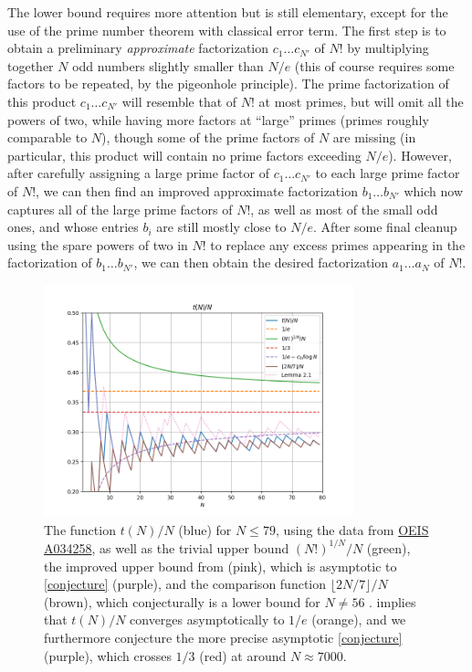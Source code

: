 \documentclass[12pt,a4paper,reqno]{amsart}
\numberwithin{equation}{section}
\theoremstyle{plain}
\theoremstyle{definition}
\begin{document}
The lower bound requires more attention but is still elementary, except for the use of the prime number theorem with classical error term.  The first step is to obtain a preliminary \emph{approximate} factorization $c_1 \dots c_{N'}$ of $N!$ by multiplying together $N$ odd numbers slightly smaller than $N/e$ (this of course requires some factors to be repeated, by the pigeonhole principle).  The prime factorization of this product $c_1 \dots c_{N'}$ will resemble that of $N!$ at most primes, but will omit all the powers of two, while having more factors at ``large'' primes (primes roughly comparable to $N$), though some of the prime factors of $N$ are missing (in particular, this product will contain no prime factors exceeding $N/e$).  However, after carefully assigning a large prime factor of $c_1 \dots c_{N'}$ to each large prime factor of $N!$, we can then find an improved approximate factorization $b_1 \dots b_{N'}$ which now captures all of the large prime factors of $N!$, as well as most of the small odd ones, and whose entries $b_i$ are still mostly close to $N/e$.  After some final cleanup using the spare powers of two in $N!$ to replace any excess primes appearing in the factorization of $b_1 \dots b_{N'}$, we can then obtain the desired factorization $a_1 \dots a_N$ of $N!$.


\begin{figure}
\centering
\includegraphics[width=0.8\textwidth]{plot.png}
\caption{The function $t(N)/N$ (blue) for $N \leq 79$, using the data from \href{https://oeis.org/A034258}{OEIS A034258}, as well as the trivial upper bound $(N!)^{1/N}/N$ (green), the improved upper bound from  (pink), which is asymptotic to \eqref{conjecture} (purple), and the comparison function $\lfloor 2N/7 \rfloor/N$ (brown), which conjecturally is a lower bound for $N \neq 56$ \cite{guy}.   implies that $t(N)/N$ converges asymptotically to $1/e$ (orange), and we furthermore conjecture the more precise asymptotic \eqref{conjecture} (purple), which crosses $1/3$ (red) at around $N \approx 7000$.}\label{fig1}
\end{figure}
\end{document}
